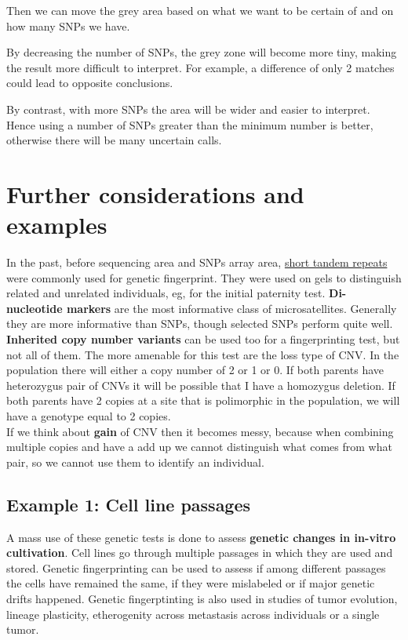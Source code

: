 Then we can move the grey area based on what we want to be certain of and on how
many SNPs we have.

By decreasing the number of SNPs, the grey zone will become more tiny, making
the result more difficult to interpret. For example, a difference of only 2
matches could lead to opposite conclusions. 

By contrast, with more SNPs the area will be wider and easier to interpret.
Hence using a number of SNPs greater than the minimum number is better,
otherwise there will be many uncertain calls. 


\section{Further considerations and examples}
In the past, before sequencing area and SNPs array area, \underline{short tandem
repeats} were commonly used for genetic fingerprint. They were used on gels to
distinguish related and unrelated individuals, eg, for the initial paternity
test.\textbf{ Di-nucleotide markers} are the most informative class of
microsatellites. Generally they are more informative than SNPs, though selected
SNPs perform quite well.\\

\textbf{Inherited copy number variants} can be used too for a fingerprinting
test, but not all of them. The more amenable for this test are the loss type of
CNV. In the population there will either a copy number of 2 or 1 or 0. If both
parents have heterozygus pair of CNVs it will be possible that I have a
homozygus deletion. If both parents have 2 copies at a site that is polimorphic
in the population, we will have a genotype equal to 2 copies. \\

If we think about \textbf{gain} of CNV then it becomes messy, because when
combining multiple copies and have a add up we cannot distinguish what comes
from what pair, so we cannot use them to identify an individual.


\subsection{Example 1: Cell line passages}

A mass use of these genetic tests is done to assess \textbf{genetic changes in
in-vitro cultivation}. Cell lines go through multiple passages in which they are
used and stored. Genetic fingerprinting can be used to assess if among different
passages the cells have remained the same, if they were mislabeled or if major
genetic drifts happened. Genetic fingerptinting is also used in studies of tumor
evolution, lineage plasticity, etherogenity across metastasis across individuals
or a single tumor. 

